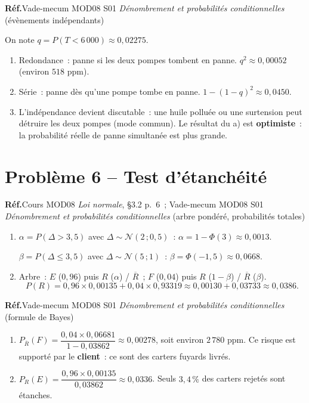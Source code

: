 \documentclass[a4paper,11pt]{article}
\newcommand{\source}[1]{{\footnotesize\color{uimmgray}\textbf{Réf.}\enspace #1}\par\smallskip}
\newcommand{\LN}{Cours MOD08 \textit{Loi normale}}
\newcommand{\VM}{Vade-mecum MOD08 S01 \textit{Dénombrement et probabilités conditionnelles}}
\begin{document}
\needspace{6cm}
\begin{correction}[-- Question 5]
\source{\VM{} (évènements indépendants)}
On note $q = P(T < 6\,000) \approx 0{,}02275$.
\begin{enumerate}[label=\alph*), leftmargin=14pt, itemsep=2pt]
  \item Redondance~: panne si les deux pompes tombent en panne. $q^2 \approx 0{,}00052$ (environ $518$ ppm).
  \item Série~: panne dès qu'une pompe tombe en panne. $1 - (1-q)^2 \approx 0{,}0450$.
  \item L'indépendance devient discutable~: une huile polluée ou une surtension peut détruire les deux pompes (mode commun). Le résultat du a) est \textbf{optimiste}~: la probabilité réelle de panne simultanée est plus grande.
\end{enumerate}
\end{correction}

\needspace{8cm}
\section{Problème 6 -- Test d'étanchéité}

\needspace{6cm}
\begin{correction}[-- Question 1]
\source{\LN{}, §3.2 p.~6~; \VM{} (arbre pondéré, probabilités totales)}
\begin{enumerate}[label=\alph*), leftmargin=14pt, itemsep=2pt]
  \item $\alpha = P(\Delta > 3{,}5)$ avec $\Delta \sim \mathcal{N}(2\,;0{,}5)$~: $\alpha = 1 - \Phi(3) \approx 0{,}0013$.

  $\beta = P(\Delta \leq 3{,}5)$ avec $\Delta \sim \mathcal{N}(5\,;1)$~: $\beta = \Phi(-1{,}5) \approx 0{,}0668$.
  \item Arbre~: $E$ ($0{,}96$) puis $R$ ($\alpha$) / $\overline{R}$~; $F$ ($0{,}04$) puis $R$ ($1 - \beta$) / $\overline{R}$ ($\beta$).
  \[
  P(R) = 0{,}96 \times 0{,}00135 + 0{,}04 \times 0{,}93319 \approx 0{,}00130 + 0{,}03733 \approx 0{,}0386.
  \]
\end{enumerate}
\end{correction}

\needspace{5cm}
\begin{correction}[-- Question 2]
\source{\VM{} (formule de Bayes)}
\begin{enumerate}[label=\alph*), leftmargin=14pt, itemsep=2pt]
  \item $P_{\overline{R}}(F) = \dfrac{0{,}04 \times 0{,}06681}{1 - 0{,}03862} \approx 0{,}00278$, soit environ $2\,780$ ppm. Ce risque est supporté par le \textbf{client}~: ce sont des carters fuyards livrés.
  \item $P_R(E) = \dfrac{0{,}96 \times 0{,}00135}{0{,}03862} \approx 0{,}0336$. Seuls $3{,}4\,\%$ des carters rejetés sont étanches.
\end{enumerate}
\end{correction}
\end{document}
